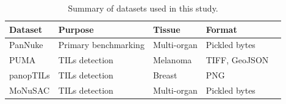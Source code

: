 \begin{table}[htbp]
	\centering
	\caption{Summary of datasets used in this study.}
	\label{tab:datasets}
	\begin{tabular}{lllll}
		\hline
		\textbf{Dataset} & \textbf{Purpose} & \textbf{Tissue} & \textbf{Format} \\
		\hline
		PanNuke   & Primary benchmarking & Multi-organ  & Pickled bytes \\
		PUMA      & TILs detection       & Melanoma     & TIFF, GeoJSON \\
		panopTILs & TILs detection        & Breast       & PNG \\
		MoNuSAC   & TILs detection        & Multi-organ  & Pickled bytes \\
		\hline
	\end{tabular}
\end{table}
